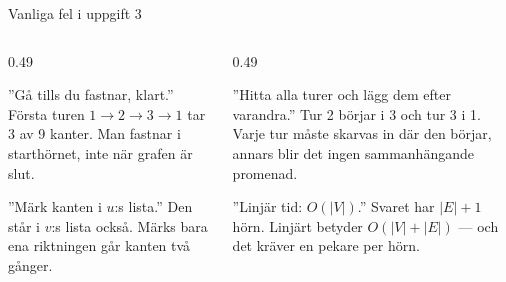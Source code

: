 \begin{frame}{Vanliga fel i uppgift 3}
\begin{columns}[T]
\begin{column}{0.49\textwidth}
\begin{missbox}[fontupper=\footnotesize]
”Gå tills du fastnar, klart.” Första turen $1\to2\to3\to1$ tar 3 av 9 kanter. Man fastnar i
starthörnet, inte när grafen är slut.
\end{missbox}
\begin{missbox}[fontupper=\footnotesize]
”Märk kanten i $u$:s lista.” Den står i $v$:s lista också. Märks bara ena riktningen går
kanten två gånger.
\end{missbox}
\end{column}
\begin{column}{0.49\textwidth}
\begin{missbox}[fontupper=\footnotesize]
”Hitta alla turer och lägg dem efter varandra.” Tur 2 börjar i 3 och tur 3 i 1. Varje tur
måste skarvas in där den börjar, annars blir det ingen sammanhängande promenad.
\end{missbox}
\begin{missbox}[fontupper=\footnotesize]
”Linjär tid: $O(|V|)$.” Svaret har $|E|+1$ hörn. Linjärt betyder $O(|V|+|E|)$ — och det kräver
en pekare per hörn.
\end{missbox}
\end{column}
\end{columns}
\end{frame}

